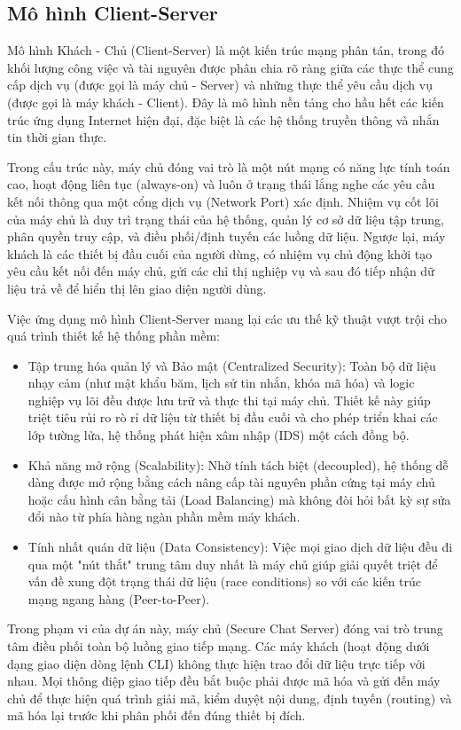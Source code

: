 \subsection{Mô hình Client-Server}

Mô hình Khách - Chủ (Client-Server) là một kiến trúc mạng phân tán, trong đó khối lượng công việc và tài nguyên được phân chia rõ ràng giữa các thực thể cung cấp dịch vụ (được gọi là máy chủ - Server) và những thực thể yêu cầu dịch vụ (được gọi là máy khách - Client). Đây là mô hình nền tảng cho hầu hết các kiến trúc ứng dụng Internet hiện đại, đặc biệt là các hệ thống truyền thông và nhắn tin thời gian thực.

Trong cấu trúc này, máy chủ đóng vai trò là một nút mạng có năng lực tính toán cao, hoạt động liên tục (always-on) và luôn ở trạng thái lắng nghe các yêu cầu kết nối thông qua một cổng dịch vụ (Network Port) xác định. Nhiệm vụ cốt lõi của máy chủ là duy trì trạng thái của hệ thống, quản lý cơ sở dữ liệu tập trung, phân quyền truy cập, và điều phối/định tuyến các luồng dữ liệu. Ngược lại, máy khách là các thiết bị đầu cuối của người dùng, có nhiệm vụ chủ động khởi tạo yêu cầu kết nối đến máy chủ, gửi các chỉ thị nghiệp vụ và sau đó tiếp nhận dữ liệu trả về để hiển thị lên giao diện người dùng.

Việc ứng dụng mô hình Client-Server mang lại các ưu thế kỹ thuật vượt trội cho quá trình thiết kế hệ thống phần mềm:
\begin{itemize}[label={-}]
    \item Tập trung hóa quản lý và Bảo mật (Centralized Security): Toàn bộ dữ liệu nhạy cảm (như mật khẩu băm, lịch sử tin nhắn, khóa mã hóa) và logic nghiệp vụ lõi đều được lưu trữ và thực thi tại máy chủ. Thiết kế này giúp triệt tiêu rủi ro rò rỉ dữ liệu từ thiết bị đầu cuối và cho phép triển khai các lớp tường lửa, hệ thống phát hiện xâm nhập (IDS) một cách đồng bộ.
    \item Khả năng mở rộng (Scalability): Nhờ tính tách biệt (decoupled), hệ thống dễ dàng được mở rộng bằng cách nâng cấp tài nguyên phần cứng tại máy chủ hoặc cấu hình cân bằng tải (Load Balancing) mà không đòi hỏi bất kỳ sự sửa đổi nào từ phía hàng ngàn phần mềm máy khách.
    \item Tính nhất quán dữ liệu (Data Consistency): Việc mọi giao dịch dữ liệu đều đi qua một "nút thắt" trung tâm duy nhất là máy chủ giúp giải quyết triệt để vấn đề xung đột trạng thái dữ liệu (race conditions) so với các kiến trúc mạng ngang hàng (Peer-to-Peer).
\end{itemize}

Trong phạm vi của dự án này, máy chủ (Secure Chat Server) đóng vai trò trung tâm điều phối toàn bộ luồng giao tiếp mạng. Các máy khách (hoạt động dưới dạng giao diện dòng lệnh CLI) không thực hiện trao đổi dữ liệu trực tiếp với nhau. Mọi thông điệp giao tiếp đều bắt buộc phải được mã hóa và gửi đến máy chủ để thực hiện quá trình giải mã, kiểm duyệt nội dung, định tuyến (routing) và mã hóa lại trước khi phân phối đến đúng thiết bị đích.
